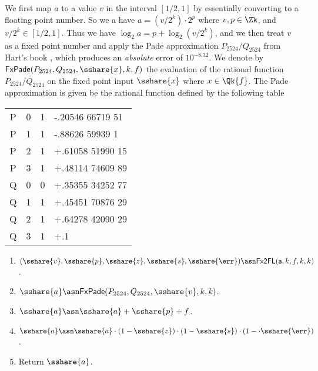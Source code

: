 We first map $a$ to a value $v$ in the interval $[1/2,1]$ by essentially
converting to a floating point number.
So we a have $a=(v/2^k) \cdot 2^p$ where $v, p \in \Zk$,
and $v/2^k \in [1/2,1]$.
Thus we have
$\log_2 a = p+\log_2 (v/2^k)$, and we then treat $v$ as a fixed
point number and apply the Pade approximation $P_{2524}/Q_{2524}$
from Hart's book \cite{Hart:1978:CA:540084},
which produces an {\em absolute} error of $10^{-8.32}$.
We denote by $\mathsf{FxPade}(P_{2524},Q_{2524},\sshare{x},k,f)$ the evaluation
of the rational function $P_{2524}/Q_{2524}$ on the fixed point input $\sshare{x}$
where $x \in \Qk{f}$.
The Pade approximation is given be the rational function defined
by the following table
\begin{center}
  \begin{tabular}{|c|c|c|l|}
    \hline
    P & 0 & 1 & -.20546 66719 51 \\
    P & 1 & 1 & -.88626 59939 1  \\
    P & 2 & 1 & +.61058 51990 15 \\
    P & 3 & 1 & +.48114 74609 89 \\
    Q & 0 & 0 & +.35355 34252 77 \\
    Q & 1 & 1 & +.45451 70876 29 \\
    Q & 2 & 1 & +.64278 42090 29 \\
    Q & 3 & 1 & +.1              \\
    \hline
  \end{tabular}
\end{center}

\begin{enumerate}
  \item $(\sshare{v},\sshare{p},\sshare{z},\sshare{s},\sshare{\err})
          \asn \mathsf{Fx2FL}(\mathsf{a},k,f,k,k)$.
  \item $\sshare{a} \asn \mathsf{FxPade}(P_{2524},Q_{2524},\sshare{v},k,k)$.
  \item $\sshare{a} \asn \sshare{a}+\sshare{p} + f$.
  \item $\sshare{a} \asn \sshare{a} \cdot (1-\sshare{z}) \cdot (1-\sshare{s}) \cdot (1-\cdot \sshare{\err})$.
  \item Return $\sshare{a}$.
\end{enumerate}

